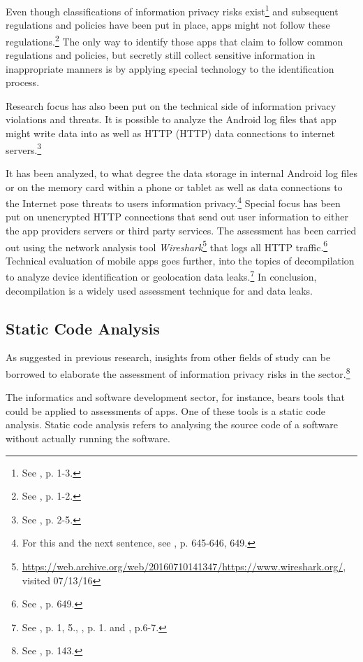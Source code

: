 Even though classifications of information privacy risks exist\footnote{See \cite{Lewis2015}, p. 1-3.} and subsequent regulations and policies have been put in place, \mH apps might not follow these regulations.\footnote{See \cite{Huckvale2015}, p. 1-2.}
The only way to identify those apps that claim to follow common regulations and policies, but secretly still collect sensitive information in inappropriate manners is by applying special technology to the identification process.

Research focus has also been put on the technical side of information privacy violations and threats. 
It is possible to analyze the Android log files that \mH app might write data into as well as \acl{HTTP} (\acs{HTTP}) data connections to internet servers.\footnote{See \cite{Huckvale2015}, p. 2-5.}

It has been analyzed, to what degree the data storage in internal Android log files or on the memory card within a phone or tablet as well as data connections to the Internet pose threats to users information privacy.\footnote{For this and the next sentence, see \cite{He2014}, p. 645-646, 649.}
Special focus has been put on unencrypted HTTP connections that send out user information to either the app providers servers or third party services.
The assessment has been carried out using the network analysis tool \textit{Wireshark}\footnote{\url{https://web.archive.org/web/20160710141347/https://www.wireshark.org/}, visited 07/13/16} that logs all HTTP traffic.\footnote{See \cite{He2014}, p. 649.}
Technical evaluation of mobile apps goes further, into the topics of decompilation to analyze device identification or geolocation data leaks.\footnote{See \cite{Mcclurg2012}, p. 1, 5., \cite{Enck2011}, p. 1. and \cite{Mitchell2013}, p.6-7.}
In conclusion, decompilation is a widely used assessment technique for \ipr and data leaks.

\subsection{Static Code Analysis}

As suggested in previous research, insights from other fields of study can be borrowed to elaborate the assessment of information privacy risks in the \mH sector.\footnote{See \cite{Arora2014}, p. 143.}

The informatics and software development sector, for instance, bears tools that could be applied to \ipr assessments of \mH apps.
One of these tools is a static code analysis.
Static code analysis refers to analysing the source code of a software without actually running the software. 

